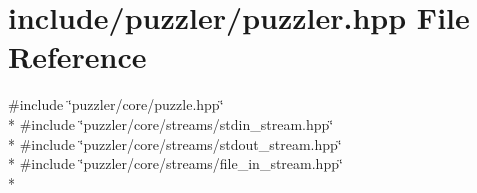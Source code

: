 \hypertarget{a00128}{}\section{include/puzzler/puzzler.hpp File Reference}
\label{a00128}
{\ttfamily \#include \char`\"{}puzzler/core/puzzle.\+hpp\char`\"{}}\\*
{\ttfamily \#include \char`\"{}puzzler/core/streams/stdin\+\_\+stream.\+hpp\char`\"{}}\\*
{\ttfamily \#include \char`\"{}puzzler/core/streams/stdout\+\_\+stream.\+hpp\char`\"{}}\\*
{\ttfamily \#include \char`\"{}puzzler/core/streams/file\+\_\+in\+\_\+stream.\+hpp\char`\"{}}\\*
